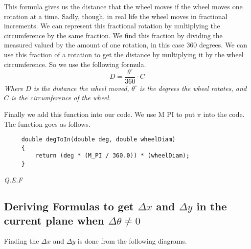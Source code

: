 \documentclass[12pt]{article}
\begin{document}
    \raggedright
    This formula gives us the distance that the wheel moves if the wheel moves one rotation at a time. Sadly, though, in real life the wheel moves in fractional increments. We can represent this fractional rotation by multiplying the circumference by the same fraction. We find this fraction by dividing the measured valued by the amount of one rotation, in this case 360 degrees. We can use this fraction of a rotation to get the distance by multiplying it by the wheel circumference. So we use the following formula.
    $$ D = \frac{\theta^\circ}{360} \cdot C $$
    \center\textit{Where $D$ is the distance the wheel moved, $\theta^\circ$ is the degrees the wheel rotates, and $C$ is the circumference of the wheel.}

    \raggedright
    Finally we add this function into our code. We use M PI to put $\pi$ into the code. The function goes as follows.

    \begin{verbatim}
     double degToIn(double deg, double wheelDiam)
     {
         return (deg * (M_PI / 360.0)) * (wheelDiam);
     }
    \end{verbatim}

    \textit{Q.E.F}

    \pagebreak
\subsection{Deriving Formulas to get $\Delta x$ and $\Delta y$ in the current plane when $\Delta\theta \neq 0$} \label{app_trighell}

Finding the $\Delta x$ and $\Delta y$ is done from the following diagrams.
\end{document}
